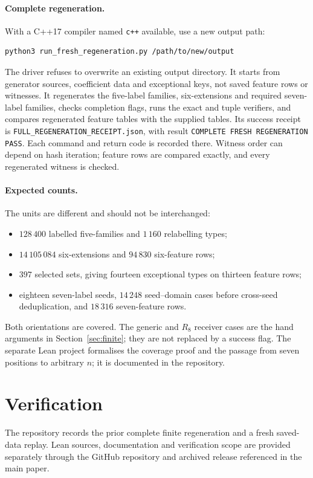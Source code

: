 \documentclass[11pt,letterpaper]{article}
\theoremstyle{remark}\newtheorem{remark}[theorem]{Remark}
\begin{document}
\paragraph{Complete regeneration.}
With a C++17 compiler named \texttt{c++} available, use a new output path:
\begin{verbatim}
python3 run_fresh_regeneration.py /path/to/new/output
\end{verbatim}
The driver refuses to overwrite an existing output directory. It starts
from generator sources, coefficient data and exceptional keys, not saved
feature rows or witnesses. It regenerates the five-label families,
six-extensions and required seven-label families, checks completion flags,
runs the exact and tuple verifiers, and compares regenerated feature
tables with the supplied tables. Its success receipt is
\texttt{FULL\_REGENERATION\_RECEIPT.json}, with result
\texttt{COMPLETE FRESH REGENERATION PASS}. Each command and return code
is recorded there. Witness order can depend on hash iteration; feature
rows are compared exactly, and every regenerated witness is checked.

\paragraph{Expected counts.}
The units are different and should not be interchanged:
\begin{itemize}
\item $128\,400$ labelled five-families and $1\,160$ relabelling types;
\item $14\,105\,084$ six-extensions and $94\,830$ six-feature rows;
\item $397$ selected sets, giving fourteen exceptional types on thirteen
feature rows;
\item eighteen seven-label seeds, $14\,248$ seed--domain cases before
cross-seed deduplication, and $18\,316$ seven-feature rows.
\end{itemize}
Both orientations are covered. The generic and $R_8$ receiver cases are
the hand arguments in Section~\ref{sec:finite}; they are not replaced by
a success flag. The separate Lean project formalises the coverage proof and the passage
from seven positions to arbitrary $n$; it is documented in the repository.

\section{Verification}
The repository records the prior complete finite regeneration and a fresh
saved-data replay. Lean sources, documentation and verification scope are
provided separately through the GitHub repository and archived release
referenced in the main paper.
\end{document}
